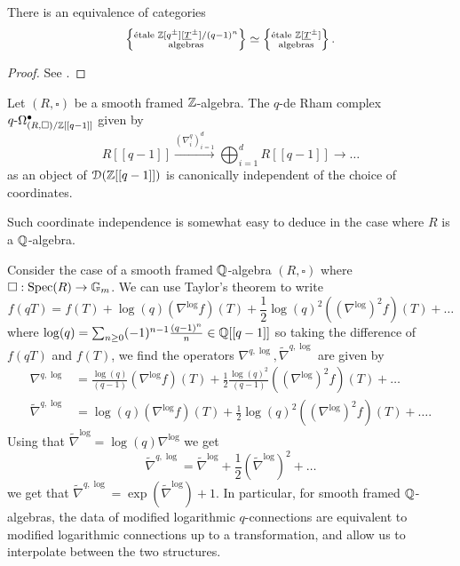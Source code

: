 \begin{lemma}\label{lem: equivalence of categories}
    There is an equivalence of categories 
    $$\left\{\substack{\text{\'{e}tale }\mathbb{Z}[q^{\pm}][\underline{T}^{\pm}]/(q-1)^{n} \\ \text{algebras}}\right\}\simeq\left\{\substack{\text{\'{e}tale }\mathbb{Z}[\underline{T}^{\pm}] \\ \text{algebras}}\right\}.$$
\end{lemma}
\begin{proof}
    See \cite[\href{https://stacks.math.columbia.edu/tag/039R}{Tag 039R}]{stacks-project}. 
\end{proof}
\begin{theorem}
    Let $(R,\square)$ be a smooth framed $\mathbb{Z}$-algebra. The $q$-de Rham complex $q\text{-}\Omega_{(R,\square)/\mathbb{Z}[[q-1]]}^{\bullet}$ given by 
    $$R[[q-1]]\xrightarrow{(\nabla_{i}^{q})_{i=1}^{d}}\bigoplus_{i=1}^{d}R[[q-1]]\longrightarrow\dots$$
    as an object of $\EuScript{D}(\mathbb{Z}[[q-1]])$ is canonically independent of the choice of coordinates. 
\end{theorem}
Such coordinate independence is somewhat easy to deduce in the case where $R$ is a $\mathbb{Q}$-algebra. 
\begin{example}\label{ex: translation between connections and q-connections}
    Consider the case of a smooth framed $\mathbb{Q}$-algebra $(R,\square)$ where $\square:\operatorname{Spec}(R)\to\mathbb{G}_{m}$. We can use Taylor's theorem to write 
    $$f(qT)=f(T)+\log(q)(\nabla^{\log}f)(T)+\frac{1}{2}\log(q)^{2}((\nabla^{\log})^{2}f)(T)+\dots$$
    where $\log(q)=\sum_{n\geq0}(-1)^{n-1}\frac{(q-1)^{n}}{n}\in\mathbb{Q}[[q-1]]$ so taking the difference of $f(qT)$ and $f(T)$, we find the operators $\nabla^{q,\log},\widetilde{\nabla}^{q,\log}$ are given by 
    \begin{align*}
        \nabla^{q,\log} &= \frac{\log(q)}{(q-1)}(\nabla^{\log}f)(T)+\frac{1}{2}\frac{\log(q)^{2}}{(q-1)}((\nabla^{\log})^{2}f)(T)+\dots\\
        \widetilde{\nabla}^{q,\log} &= \log(q)(\nabla^{\log}f)(T)+\frac{1}{2}\log(q)^{2}((\nabla^{\log})^{2}f)(T)+\dots.
    \end{align*}
    Using that $\widetilde{\nabla}^{\log}=\log(q)\nabla^{\log}$ we get 
    $$\widetilde{\nabla}^{q,\log}=\widetilde{\nabla}^{\log}+\frac{1}{2}(\widetilde{\nabla}^{\log})^{2}+\dots$$
    we get that $\widetilde{\nabla}^{q,\log}=\exp(\widetilde{\nabla}^{\log})+1$. In particular, for smooth framed $\mathbb{Q}$-algebras, the data of modified logarithmic $q$-connections are equivalent to modified logarithmic connections up to a transformation, and allow us to interpolate between the two structures. 
\end{example}
